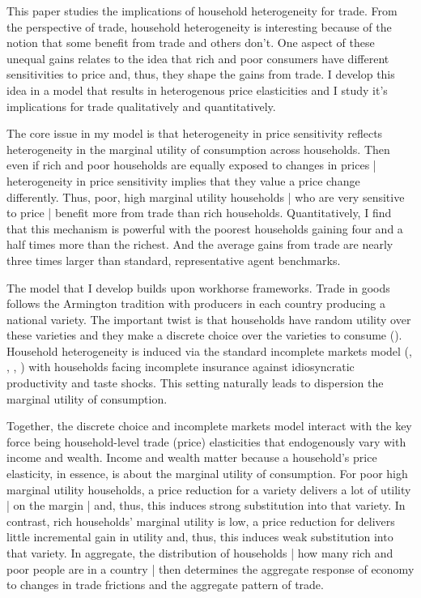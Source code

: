 \documentclass[12pt,pdftex]{article}
\begin{document}
\begin{onehalfspacing}
\hspace{-0.05cm}



\thispagestyle{empty}
\newpage
\normalsize

This paper studies the implications of household heterogeneity for trade. From the perspective of trade, household heterogeneity is interesting because of the notion that some benefit from trade and others don't. One aspect of these unequal gains relates to the idea that rich and poor consumers have different sensitivities to price and, thus, they shape the gains from trade.  I develop this idea in a model that results in heterogenous price elasticities and I study it's implications for trade qualitatively and quantitatively.

The core issue in my model is that heterogeneity in price sensitivity reflects heterogeneity in the marginal utility of consumption across households. Then even if rich and poor households are equally exposed to changes in prices | heterogeneity in price sensitivity implies that they value a price change differently. Thus, poor, high marginal utility households | who are very sensitive to price | benefit more from trade than rich households. Quantitatively, I find that this mechanism is powerful with the poorest households gaining four and a half times more than the richest. And the average gains from trade are nearly three times larger than standard, representative agent benchmarks.

The model that I develop builds upon workhorse frameworks. Trade in goods follows the Armington tradition with producers in each country producing a national variety. The important twist is that households have random utility over these varieties and they make a discrete choice over the varieties to consume (\citet{mcfadden1974frontiers}).  Household heterogeneity is induced via the standard incomplete markets model (\citet{bewley1979optimum}, \citet{imrohorouglu1989cost}, \citet{huggett1993risk}, \citet{aiyagari1994uninsured}) with households facing incomplete insurance against idiosyncratic productivity and taste shocks. This setting naturally leads to dispersion the marginal utility of consumption.

Together, the discrete choice and incomplete markets model interact with the key force being household-level trade (price) elasticities that endogenously vary with income and wealth. Income and wealth matter because a household's price elasticity, in essence, is about the marginal utility of consumption. For poor high marginal utility households, a price reduction for a variety delivers a lot of utility | on the margin | and, thus, this induces strong substitution into that variety. In contrast, rich households' marginal utility is low, a price reduction for delivers little incremental gain in utility and, thus, this induces weak substitution into that variety. In aggregate, the distribution of households | how many rich and poor people are in a country | then determines the aggregate response of economy to changes in trade frictions and the aggregate pattern of trade.


\end{onehalfspacing}
\end{document}

